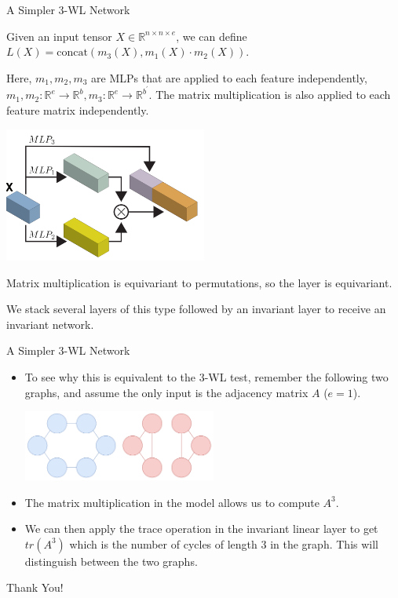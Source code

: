 \documentclass{beamer}
\begin{document}
\begin{frame}{A Simpler 3-WL Network}
    \begin{itemize}
        {\small
        \item Given an input tensor $X \in \mathbb{R}^{n\times n\times e}$, we can define $L(X) = \text{concat}(m_3(X), m_1(X) \cdot m_2(X))$. 
        \item Here, $m_1, m_2, m_3$ are MLPs that are applied to each feature independently, $m_1, m_2: \mathbb{R}^e \rightarrow \mathbb{R}^b, m_3: \mathbb{R}^e \rightarrow \mathbb{R}^{b^\prime}$. The matrix multiplication is also applied to each feature matrix independently.
        \begin{center}
            \includegraphics[width=0.5\textwidth]{../figures/simple.png}
        \end{center}
        \item Matrix multiplication is equivariant to permutations, so the layer is equivariant.
        \item We stack several layers of this type followed by an invariant layer to receive an invariant network.
        }
    \end{itemize}
\end{frame}
\begin{frame}{A Simpler 3-WL Network}
    \begin{itemize}
        \item To see why this is equivalent to the $3$-WL test, remember the following two graphs, and assume the only input is the adjacency matrix $A$ ($e=1$).
        \begin{center}
            \includegraphics[width=0.5\textwidth]{../figures/wl_equivalent.png}
        \end{center}
        \pause
        \item The matrix multiplication in the model allows us to compute $A^3$. 
        \item We can then apply the trace operation in the invariant linear layer to get $tr(A^3)$ which is the number of cycles of length $3$ in the graph. This will distinguish between the two graphs.
    \end{itemize}
\end{frame}
\begin{frame}[plain]
    \centering
    \Huge Thank You!
\end{frame}
\end{document}
